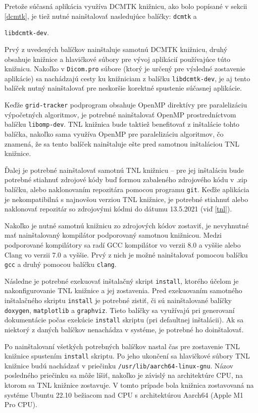 Pretože súčasná aplikácia využíva DCMTK knižnicu, ako bolo popísané v sekcii \ref{dcmtk}, je tiež nutné nainštalovať nasledujúce balíčky: \texttt{dcmtk} a {\texttt{libdcmtk-dev}.

Prvý z uvedených balíčkov nainštaluje samotnú DCMTK knižnicu, druhý obsahuje knižnice a hlavičkové súbory pre vývoj aplikácií používajúce túto knižnicu. Nakoľko v \texttt{Dicom.pro} súbore (ktorý je určený pre výsledné zostavenie aplikácie) sa nachádzajú cesty ku knižniciam z balíčku \texttt{libdcmtk-dev}, je aj tento balíček nutný nainštalovať pre neskoršie korektné spustenie súčasnej aplikácie.

Keďže \texttt{grid-tracker} podprogram obsahuje OpenMP direktívy pre paralelizáciu výpočetných algoritmov, je potrebné nainštalovať OpenMP prostredníctvom balíčku \texttt{libomp-dev}. TNL knižnica bude taktiež benefitovať z inštalácie tohto balíčka, nakoľko sama využíva OpenMP pre paralelizáciu algoritmov, čo znamená, že sa tento balíček nainštaluje ešte pred samotnou inštaláciou TNL knižnice.

Ďalej je potrebné nainštalovať samotnú TNL knižnicu -- pre jej inštaláciu bude potrebné stiahnuť zdrojové kódy buď formou zabaleného zdrojového kódu v .zip balíčku, alebo naklonovaním repozitára pomocou programu \texttt{git}. Keďže aplikácia je nekompatibilná s najnovšou verziou TNL knižnice, je potrebné stiahnuť alebo naklonovať repozitár so zdrojovými kódmi do dátumu 13.5.2021 (viď \ref{tnl}).

Nakoľko je nutné samotnú knižnicu zo zdrojových kódov zostaviť, je nevyhnutné mať nainštalovaný kompilátor podporovaný samotnou knižnicou. Medzi podporované kompilátory sa radí GCC kompilátor vo verzii 8.0 a vyššie alebo Clang vo verzii 7.0 a vyššie. Prvý z nich je možné nainštalovať pomocou balíčku \texttt{gcc} a druhý pomocou balíčku \texttt{clang}.

Následne je potrebné exekuovať inštalačný skript \texttt{install}, ktorého účelom je nakonfigurovanie TNL knižnice a jej zostavenia.
Pred exekuovaním samotného inštalačného skriptu \texttt{install} je potrebné zistiť, či sú nainštalované balíčky \texttt{doxygen}, \texttt{matplotlib} a \texttt{graphviz}. Tieto balíčky sa využívajú pri generovaní dokumentácie počas exekúcie \texttt{install} skriptu (pri defaultnej inštalácii). Ak sa niektorý z daných balíčkov nenachádza v systéme, je potrebné ho doinštalovať.

Po nainštalovaní všetkých potrebných balíčkov nastal čas pre zostavenie TNL knižnice spustením \texttt{install} skriptu. Po jeho ukončení sa hlavičkové súbory TNL knižnice budú nachádzať v priečinku \texttt{/usr/lib/aarch64-linux-gnu}. Názov posledného priečinku sa môže líšiť, nakoľko je závislý na architektúre CPU, na ktorom sa TNL knižnice zostavuje. V tomto prípade bola knižnica zostavovaná na systéme Ubuntu 22.10 bežiacom nad CPU s architektúrou Aarch64 (Apple M1 Pro CPU).

}
